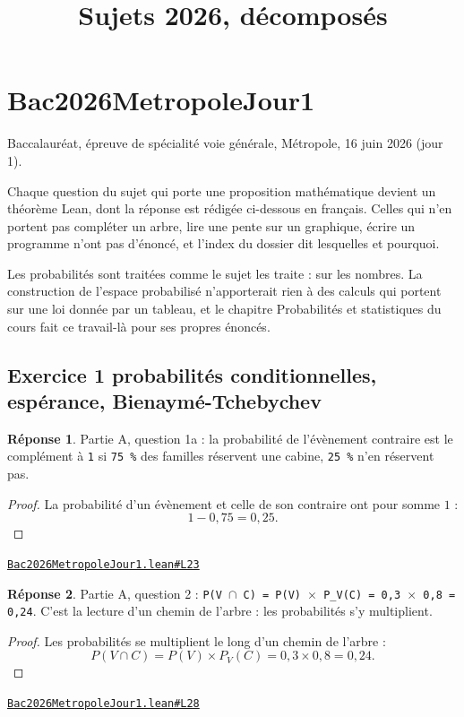 \documentclass[11pt,a4paper]{article}
\title{Sujets 2026, décomposés}
\date{}
\theoremstyle{definition}
\theoremstyle{plain}
\theoremstyle{definition}
\newtheorem*{reponse}{Réponse}
\newcommand{\source}[2]{\par\smallskip\noindent\hfill{\footnotesize\href{#1}{\texttt{#2}}}\par\smallskip}
\begin{document}
\maketitle
\sloppy

\section{Bac2026MetropoleJour1}

\noindent
Baccalauréat, épreuve de spécialité \textemdash{} voie générale, Métropole, 16 juin 2026 (jour 1).

Chaque question du sujet qui porte une proposition mathématique devient un théorème
Lean, dont la réponse est rédigée ci-dessous en français. Celles qui n'en portent pas \textemdash{} compléter un arbre, lire une pente sur un
graphique, écrire un programme \textemdash{} n'ont pas d'énoncé, et l'index du dossier dit
lesquelles et pourquoi.

Les probabilités sont traitées comme le sujet les traite : sur les nombres. La
construction de l'espace probabilisé n'apporterait rien à des calculs qui portent
sur une loi donnée par un tableau, et le chapitre \og{} Probabilités et statistiques \fg{}
du cours fait ce travail-là pour ses propres énoncés.

\subsection{Exercice 1 \textemdash{} probabilités conditionnelles, espérance, Bienaymé-Tchebychev}

\begin{reponse}
Partie A, question 1a : la probabilité de l'évènement contraire est le
complément à \texttt{1} \textemdash{} si \texttt{75 \%} des familles réservent une cabine, \texttt{25 \%} n'en
réservent pas.
\end{reponse}
\begin{proof}
La probabilité d'un évènement et celle de son contraire ont pour somme $1$ :
\[ 1 - 0{,}75 = 0{,}25 . \]
\end{proof}
\source{https://github.com/Commutator-IO/learn-lean/blob/main/exams/2026/Bac2026MetropoleJour1.lean\#L23}{Bac2026MetropoleJour1.lean\#L23}

\begin{reponse}
Partie A, question 2 : \texttt{P(V \(\cap\) C) = P(V) \(\times\) P\_V(C) = 0,3 \(\times\) 0,8 = 0,24}. C'est la
lecture d'un chemin de l'arbre : les probabilités s'y multiplient.
\end{reponse}
\begin{proof}
Les probabilités se multiplient le long d'un chemin de l'arbre :
\[ P(V \cap C) = P(V) \times P_V(C) = 0{,}3 \times 0{,}8 = 0{,}24 . \]
\end{proof}
\source{https://github.com/Commutator-IO/learn-lean/blob/main/exams/2026/Bac2026MetropoleJour1.lean\#L28}{Bac2026MetropoleJour1.lean\#L28}
\end{document}
